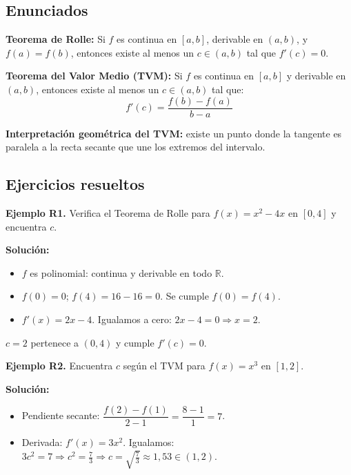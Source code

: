 \documentclass[12pt, letterpaper]{article}
\begin{document}
\subsection{Enunciados}

\begin{cuadroteoria}
  \textbf{Teorema de Rolle:} Si $f$ es continua en $[a, b]$, derivable en $(a, b)$, y $f(a) = f(b)$, entonces existe al menos un $c \in (a, b)$ tal que $f'(c) = 0$.

  \textbf{Teorema del Valor Medio (TVM):} Si $f$ es continua en $[a, b]$ y derivable en $(a, b)$, entonces existe al menos un $c \in (a, b)$ tal que:
  $$f'(c) = \frac{f(b) - f(a)}{b - a}$$
\end{cuadroteoria}

\begin{cuadrosolucion}
  \textbf{Interpretación geométrica del TVM:} existe un punto donde la tangente es paralela a la recta secante que une los extremos del intervalo.
\end{cuadrosolucion}

\subsection{Ejercicios resueltos}

\textbf{Ejemplo R1.} Verifica el Teorema de Rolle para $f(x) = x^2 - 4x$ en $[0, 4]$ y encuentra $c$.

\begin{cuadrosolucion}
  \textbf{Solución:}
  \begin{itemize}
    \item $f$ es polinomial: continua y derivable en todo $\mathbb{R}$.
    \item $f(0) = 0$; $f(4) = 16 - 16 = 0$. Se cumple $f(0) = f(4)$.
    \item $f'(x) = 2x - 4$. Igualamos a cero: $2x - 4 = 0 \Rightarrow x = 2$.
  \end{itemize}
  $c = 2$ pertenece a $(0, 4)$ y cumple $f'(c) = 0$.
\end{cuadrosolucion}

\textbf{Ejemplo R2.} Encuentra $c$ según el TVM para $f(x) = x^3$ en $[1, 2]$.

\begin{cuadrosolucion}
  \textbf{Solución:}
  \begin{itemize}
    \item Pendiente secante: $\dfrac{f(2) - f(1)}{2 - 1} = \dfrac{8 - 1}{1} = 7$.
    \item Derivada: $f'(x) = 3x^2$. Igualamos: $3c^2 = 7 \Rightarrow c^2 = \frac{7}{3} \Rightarrow c = \sqrt{\frac{7}{3}} \approx 1{,}53 \in (1, 2)$.
  \end{itemize}
\end{cuadrosolucion}
\end{document}
